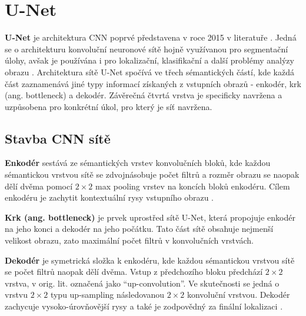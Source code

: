 \section{U-Net}
\label{sec:Chapter22}

\textbf{U-Net} je architektura CNN poprvé představena v roce 2015 v literatuře \cite{unet}. Jedná se o architekturu konvoluční neuronové sítě hojně využívanou pro segmentační úlohy, avšak je používána i pro lokalizační, klasifikační a další problémy analýzy obrazu \cite{unet_success}. Architektura sítě U-Net spočívá ve třech sémantických částí, kde každá část zaznamenává jiné typy informací získaných z vstupních obrazů - enkodér, krk (ang. bottleneck) a dekodér. Závěrečná čtvrtá vrstva je specificky navržena a uzpůsobena pro konkrétní úkol, pro který je síť navržena.

\subsection{Stavba CNN sítě}
\label{subsec:Chapter221}

\textbf{Enkodér} sestává ze sémantických vrstev konvolučních bloků, kde každou sémantickou vrstvou sítě se zdvojnásobuje počet filtrů a rozměr obrazu se naopak dělí dvěma pomocí $2\times2$ max pooling vrstev na koncích bloků enkodéru. Cílem enkodéru je zachytit kontextuální rysy vstupního obrazu \cite{unet_success}.

\textbf{Krk (ang. bottleneck)} je prvek uprostřed sítě U-Net, která propojuje enkodér na jeho konci a dekodér na jeho počátku. Tato část sítě obsahuje nejmenší velikost obrazu, zato maximální počet filtrů v konvolučních vrstvách.

\textbf{Dekodér} je symetrická složka k enkodéru, kde každou sémantickou vrstvou sítě se počet filtrů naopak dělí dvěma. Vstup z předchozího bloku předchází $2\times2$ vrstva, v orig. lit. označená jako \enquote{up-convolution}. Ve skutečnosti se jedná o vrstvu $2\times2$ typu up-sampling následovanou $2\times2$ konvoluční vrstvou. Dekodér zachycuje vysoko-úrovňovější rysy a také je zodpovědný za finální lokalizaci \cite{unet_success}.

